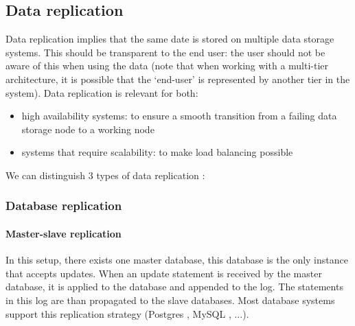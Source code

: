 \documentclass[12pt]{report}
\begin{document}
\subsection{Data replication}
Data replication implies that the same date is stored on multiple
data storage systems. This should be transparent to the end user: the
user should not be aware of this when using the data (note that when
working with a multi-tier architecture, it is possible that the
`end-user'  is represented by another tier in the system).
Data replication is relevant for both:
\begin{itemize}
\item high availability systems: to ensure a smooth transition from a
  failing data storage node to a working node
\item systems that require scalability: to make load balancing possible
\end{itemize}
We can distinguish 3 types of data replication
\cite{datareplication:2013} :

\subsubsection{Database replication}

\paragraph*{Master-slave replication}
In this setup, there exists one master database, this database is the only instance
that accepts updates. When an update statement is received by the
master database, it is applied to the database and appended to the log. The statements
in this log are than propagated to the slave databases.
Most database systems support this replication strategy (Postgres \cite{postgres_db:2013},
MySQL \cite{mysql_db:2013}, ...).
\end{document}
